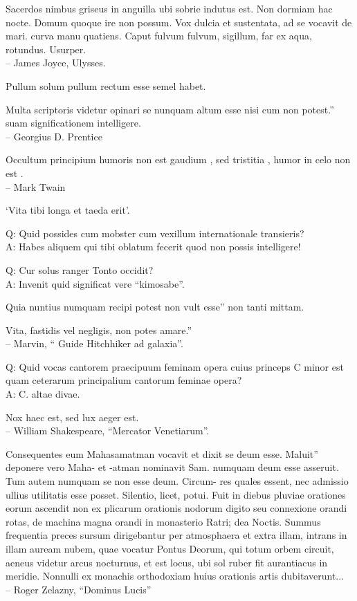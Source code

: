 \documentclass[titlepage,12pt]{memoir}
\begin{document}
 Sacerdos nimbus griseus in anguilla ubi sobrie indutus est.
Non dormiam hac nocte. Domum quoque ire non possum.
Vox dulcia et sustentata, ad se vocavit de mari.
curva manu quatiens. Caput fulvum fulvum, sigillum, far
ex aqua, rotundus. Usurper.
\\-- James Joyce, Ulysses.

Pullum solum pullum rectum esse semel habet.

Multa scriptoris videtur opinari se nunquam altum esse nisi cum non potest.”
suam significationem intelligere.
\\-- Georgius D. Prentice

 Occultum principium humoris non est gaudium , sed tristitia , humor in celo non est .
\\-- Mark Twain

‘Vita tibi longa et taeda erit’.

Q: Quid possides cum mobster cum vexillum internationale transieris?\\
A: Habes aliquem qui tibi oblatum fecerit quod non possis intelligere!

Q: Cur solus ranger Tonto occidit?\\
A: Invenit quid significat vere “kimosabe”.

Quia nuntius numquam recipi potest non vult esse”
non tanti mittam.

Vita, fastidis vel negligis, non potes amare.”
\\-- Marvin, “ Guide Hitchhiker ad galaxia”.

Q: Quid vocas cantorem praecipuum feminam opera cuius princeps C
minor est quam ceterarum principalium cantorum feminae opera?\\
A: C. altae divae.

Nox haec est, sed lux aeger est.
\\-- William Shakespeare, “Mercator Venetiarum”.

Consequentes eum Mahasamatman vocavit et dixit se deum esse. Maluit”
deponere vero Maha- et -atman nominavit Sam. numquam
deum esse asseruit. Tum autem numquam se non esse deum. Circum-
res quales essent, nec admissio ullius utilitatis esse posset.
Silentio, licet, potui. Fuit in diebus pluviae orationes eorum
ascendit non ex plicarum orationis nodorum digito seu connexione
orandi rotas, de machina magna orandi in monasterio Ratri;
dea Noctis. Summus frequentia preces sursum dirigebantur per
atmosphaera et extra illam, intrans in illam auream nubem, quae vocatur
Pontus Deorum, qui totum orbem circuit, aeneus videtur
arcus nocturnus, et est locus, ubi sol ruber fit aurantiacus in meridie.
Nonnulli ex monachis orthodoxiam huius orationis artis dubitaverunt...
\\-- Roger Zelazny, “Dominus Lucis”
\end{document}
